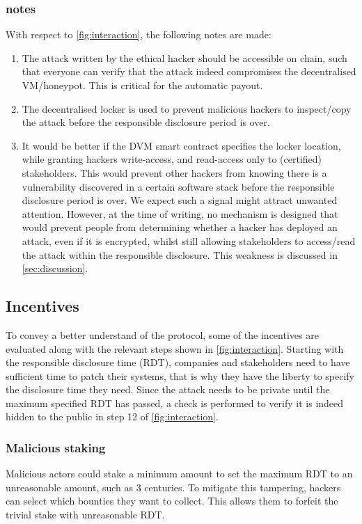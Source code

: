 \subsubsection{ notes}
With respect to \cref{fig:interaction}, the following notes are made:
\begin{enumerate} 
    \item The attack written by the ethical hacker should be accessible on chain, such that everyone can verify that the attack indeed compromises the decentralised VM/honeypot. This is critical for the automatic payout.
    \item The decentralised locker is used to prevent malicious hackers to inspect/copy the attack before the responsible disclosure period is over.
    \item It would be better if the DVM smart contract specifies the locker location, while granting hackers write-access, and read-access only to (certified) stakeholders. This would prevent other hackers from knowing there is a vulnerability discovered in a certain software stack before the responsible disclosure period is over. We expect such a signal might attract unwanted attention. However, at the time of writing, no mechanism is designed that would prevent people from determining whether a hacker has deployed an attack, even if it is encrypted, whilst still allowing stakeholders to access/read the attack within the responsible disclosure. This weakness is discussed in \cref{sec:discussion}.
\end{enumerate}

\subsection{Incentives}
To convey a better understand of the protocol, some of the incentives are evaluated along with the relevant steps shown in \cref{fig:interaction}. Starting with the responsible disclosure time (RDT), companies and stakeholders need to have sufficient time to patch their systems, that is why they have the liberty to specify the disclosure time they need. Since the attack needs to be private until the maximum specified RDT has passed, a check is performed to verify it is indeed hidden to the public in step 12 of \cref{fig:interaction}. 

\subsubsection{Malicious staking}
Malicious actors could stake a minimum amount to set the maximum RDT to an unreasonable amount, such as 3 centuries. To mitigate this tampering, hackers can select which bounties they want to collect. This allows them to forfeit the trivial stake with unreasonable RDT.

